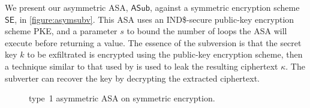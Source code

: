 We present our asymmetric ASA, $\mathsf{ASub}$, against a symmetric encryption scheme $\mathsf{SE}$, in \autoref{figure:asymsubv}. This ASA uses an IND\$-secure public-key encryption scheme PKE, and a parameter $s$ to bound the number of loops the ASA will execute before returning a value. The essence of the subversion is that the secret key $k$ to be exfiltrated is encrypted using the public-key encryption scheme, then a technique similar to that used by \cite{C:BelPatRog14} is used to leak the resulting ciphertext $\kappa$. The subverter can recover the key by decrypting the extracted ciphertext.

\begin{wrapfigure}{L}{0.4\textwidth}
\centering
{}
\caption[type~1 asymmetric ASA on symmetric encryption]{type~1 asymmetric ASA on symmetric encryption.}
\label{figure:asymsubv}
\end{wrapfigure}

